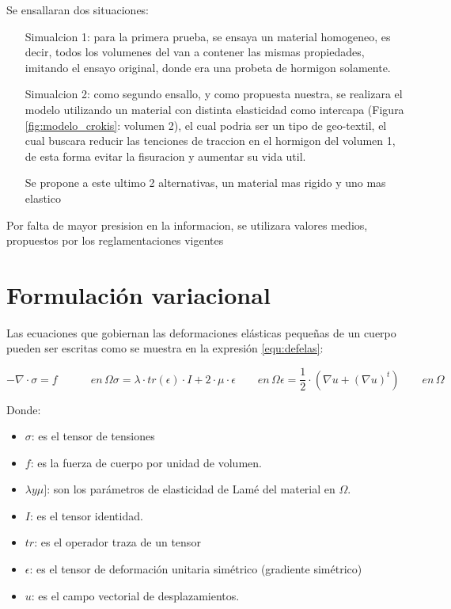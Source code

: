 \documentclass[12pt, a4paper]{article}
\begin{document}
Se ensallaran dos situaciones:

\begin{itemize}
	\item[Simualcion 1:] para la primera prueba, se ensaya un material homogeneo, es decir, todos los volumenes del van a contener las mismas propiedades, imitando el ensayo original, donde era una probeta de hormigon solamente. 
	\item[Simualcion 2:] como segundo ensallo, y como propuesta nuestra, se realizara el modelo utilizando un material con distinta elasticidad como intercapa (Figura \ref{fig:modelo_crokis}: volumen 2), el cual podria ser un tipo de geo-textil, el cual buscara reducir las tenciones de traccion en el hormigon del volumen 1, de esta forma evitar la fisuracion y aumentar su vida util.
	
	Se propone a este ultimo 2 alternativas, un material mas rigido y uno mas elastico
\end{itemize}

Por falta de mayor presision en la informacion, se utilizara valores medios, propuestos por los reglamentaciones vigentes

\section{Formulación variacional}
Las ecuaciones que gobiernan las deformaciones elásticas pequeñas de un cuerpo pueden ser escritas como se muestra en la expresión \ref{equ:defelas}:


\begin{subequations}
	\begin{equation}
		- \nabla \cdot \sigma  = f  \quad \quad \quad en \, \Omega
		\label{equ:defelas-a}
	\end{equation}
	\begin{equation}
		\sigma  = \lambda \cdot tr(\epsilon) \cdot I + 2 \cdot \mu \cdot \epsilon \quad \quad en \, \Omega
		\label{equ:defelas-b}
	\end{equation}
	\begin{equation}
		\epsilon  = \frac{1}{2} \cdot (\nabla u + (\nabla u)^t) \quad \quad en \, \Omega
		\label{equ:defelas-c}
	\end{equation}
	\label{equ:defelas}
\end{subequations}

Donde:
\begin{itemize}
	\item $\sigma$: es el tensor de tensiones
	\item $f$: es la fuerza de cuerpo por unidad de volumen.
	\item $\lambda y \mu]$: son los parámetros de elasticidad de Lamé del material en $\Omega$.
	\item $I$: es el tensor identidad.
	\item $tr$: es el operador traza de un tensor
	\item $\epsilon$: es el tensor de deformación unitaria simétrico (gradiente simétrico)
	\item $u$: es el campo vectorial de desplazamientos. 
\end{itemize}
\end{document}
